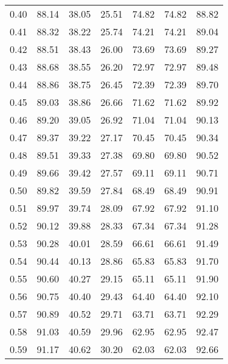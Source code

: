 \begin{tabular}{|c|c|c|c|c|c|c|}
      0.40 &     88.14 &     38.05 &      25.51 &   74.82 &      74.82 &         88.82 \\
      0.41 &     88.32 &     38.22 &      25.74 &   74.21 &      74.21 &         89.04 \\
      0.42 &     88.51 &     38.43 &      26.00 &   73.69 &      73.69 &         89.27 \\
      0.43 &     88.68 &     38.55 &      26.20 &   72.97 &      72.97 &         89.48 \\
      0.44 &     88.86 &     38.75 &      26.45 &   72.39 &      72.39 &         89.70 \\
      0.45 &     89.03 &     38.86 &      26.66 &   71.62 &      71.62 &         89.92 \\
      0.46 &     89.20 &     39.05 &      26.92 &   71.04 &      71.04 &         90.13 \\
      0.47 &     89.37 &     39.22 &      27.17 &   70.45 &      70.45 &         90.34 \\
      0.48 &     89.51 &     39.33 &      27.38 &   69.80 &      69.80 &         90.52 \\
      0.49 &     89.66 &     39.42 &      27.57 &   69.11 &      69.11 &         90.71 \\
      0.50 &     89.82 &     39.59 &      27.84 &   68.49 &      68.49 &         90.91 \\
      0.51 &     89.97 &     39.74 &      28.09 &   67.92 &      67.92 &         91.10 \\
      0.52 &     90.12 &     39.88 &      28.33 &   67.34 &      67.34 &         91.28 \\
      0.53 &     90.28 &     40.01 &      28.59 &   66.61 &      66.61 &         91.49 \\
      0.54 &     90.44 &     40.13 &      28.86 &   65.83 &      65.83 &         91.70 \\
      0.55 &     90.60 &     40.27 &      29.15 &   65.11 &      65.11 &         91.90 \\
      0.56 &     90.75 &     40.40 &      29.43 &   64.40 &      64.40 &         92.10 \\
      0.57 &     90.89 &     40.52 &      29.71 &   63.71 &      63.71 &         92.29 \\
      0.58 &     91.03 &     40.59 &      29.96 &   62.95 &      62.95 &         92.47 \\
      0.59 &     91.17 &     40.62 &      30.20 &   62.03 &      62.03 &         92.66 \\

\end{tabular}
